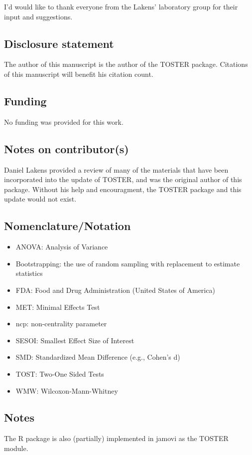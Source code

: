 \documentclass[]{interact}
\theoremstyle{plain}%
\theoremstyle{definition}
\theoremstyle{remark}
\providecommand{\tightlist}{%
  \setlength{\itemsep}{0pt}\setlength{\parskip}{0pt}}
\def\tightlist{}
\begin{document}
I'd would like to thank everyone from the Lakens' laboratory group for
their input and suggestions.

\hypertarget{disclosure-statement}{%
\subsection*{Disclosure statement}\label{disclosure-statement}}

The author of this manuscript is the author of the TOSTER package.
Citations of this manuscript will benefit his citation count.

\hypertarget{funding}{%
\subsection*{Funding}\label{funding}}

No funding was provided for this work.

\hypertarget{notes-on-contributors}{%
\subsection*{Notes on contributor(s)}\label{notes-on-contributors}}

Daniel Lakens provided a review of many of the materials that have been
incorporated into the update of TOSTER, and was the original author of
this package. Without his help and encouragment, the TOSTER package and
this update would not exist.

\hypertarget{nomenclaturenotation}{%
\subsection*{Nomenclature/Notation}\label{nomenclaturenotation}}

\begin{itemize}
\tightlist
\item
  ANOVA: Analysis of Variance
\item
  Bootstrapping: the use of random sampling with replacement to estimate
  statistics
\item
  FDA: Food and Drug Administration (United States of America)
\item
  MET: Minimal Effects Test
\item
  ncp: non-centrality parameter
\item
  SESOI: Smallest Effect Size of Interest
\item
  SMD: Standardized Mean Difference (e.g., Cohen's d)
\item
  TOST: Two-One Sided Tests
\item
  WMW: Wilcoxon-Mann-Whitney
\end{itemize}

\hypertarget{notes}{%
\subsection*{Notes}\label{notes}}

The R package is also (partially) implemented in jamovi as the TOSTER
module.

\newpage



\end{document}
